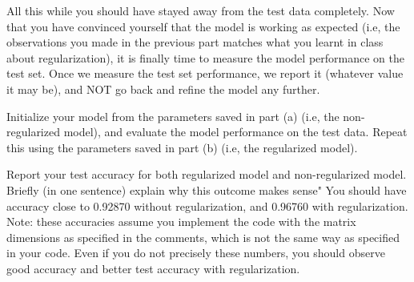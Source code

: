 \item {}
All this while you should have stayed away from the test data completely. Now that
you have convinced yourself that the model is working as expected (i.e, the
observations you made in the previous part matches what you learnt in class
about regularization), it is finally time to measure the model performance on
the test set. Once we measure the test set performance, we report it (whatever
value it may be), and NOT go back and refine the model any further.

Initialize your model from the parameters saved in part (a) (i.e, the non-regularized
model), and evaluate the model performance on the test data. Repeat this using the
parameters saved in part (b) (i.e, the regularized model).

Report your test accuracy for both regularized model and non-regularized model.  
Briefly (in one sentence) explain why this outcome makes sense"
You should have accuracy close to 0.92870 without regularization, and 0.96760 with regularization.
Note: these accuracies assume you implement the code with the matrix dimensions as specified in
the comments, which is not the same way as specified in your code. Even if you do not precisely these
numbers, you should observe good accuracy and better test accuracy with regularization.

